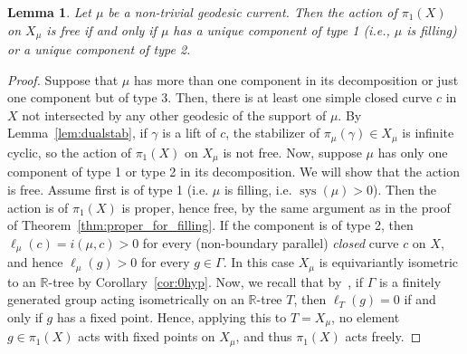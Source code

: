\documentclass[12pt,article]{amsart}
\numberwithin{equation}{section}
\numberwithin{figure}{section}
\newtheorem{lemma}[equation]{Lemma}
\theoremstyle{definition}
\theoremstyle{plain}
\DeclareMathOperator{\sys}{sys}
\begin{document}
\begin{lemma}
 Let $\mu$ be a non-trivial geodesic current.
 Then the action of $\pi_1(X)$ on $X_{\mu}$ is free if and only if $\mu$ has a unique component of type 1 (i.e., $\mu$ is filling) or a unique component of type 2.
\label{lem:free}
\end{lemma}
\begin{proof}
 Suppose that $\mu$ has more than one component in its decomposition or just one component but of type 3. Then, there is at least one simple closed curve $c$ in $X$ not intersected by any other geodesic of the support of $\mu$. By Lemma~\ref{lem:dualstab}, if $\gamma$ is a lift of $c$, the stabilizer of $\pi_{\mu}(\gamma) \in X_{\mu}$ is infinite cyclic, so the action of $\pi_1(X)$ on $X_{\mu}$ is not free.
Now, suppose $\mu$ has only one component of type 1 or type 2 in its decomposition. We will show that the action is free.
Assume first is of type 1 (i.e. $\mu$ is filling, i.e. $\sys(\mu)>0$). Then the action is of $\pi_1(X)$ is proper, hence free, by the same argument as in the proof of Theorem~\ref{thm:proper_for_filling}.
If the component is of type 2, then $\ell_{\mu}(c)=i(\mu, c)>0$ for every (non-boundary parallel) \emph{closed} curve $c$ on $X$, and hence $\ell_{\mu}(g)>0$ for every $g \in \Gamma$. In this case $X_{\mu}$ is equivariantly isometric to an $\mathbb{R}$-tree by Corollary~\ref{cor:0hyp}. Now, we recall that by~\cite[1.3]{CM87:Groups}, if $\Gamma$ is a finitely generated group acting isometrically on an $\mathbb{R}$-tree $T$, then $\ell_{T}(g)=0$ if and only if $g$ has a fixed point. Hence, applying this to $T=X_{\mu}$, no element $g \in \pi_1(X)$ acts with fixed points on $X_{\mu}$, and thus $\pi_1(X)$ acts freely.
\end{proof}
\end{document}
